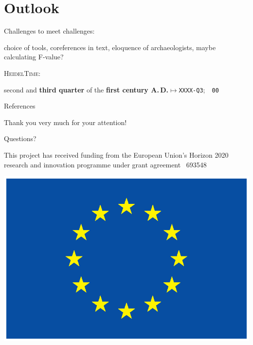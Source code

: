\documentclass[xcolor=x11names, aspectratio=169,usenames,dvipsnames]{beamer}
\begin{document}
\section{Outlook}

\begin{frame}{Challenges to meet}
challenges:

choice of tools, coreferences in text, eloquence of archaeologists, maybe calculating F-value?

\textsc{HeidelTime}:\vspace{-1em}
\begin{center}
second and \textbf{third quarter} of the \textbf{first century A.\,D.}\quad$\longmapsto$\quad\texttt{XXXX-Q3};~~\texttt{00}
\end{center}
\end{frame}

\begin{frame}{References}

\printbibliography[heading=none]
\end{frame}


\begin{frame}[plain]
\vfill\vfill\vfill
\begin{center}\Large
Thank you very much for your attention!\\\bigskip

Questions?
\end{center}\vfill\vfill

\hfill
\begin{minipage}{0.7\textwidth}\scriptsize
\begin{flushright}
This project has received funding from the European Union's Horizon 2020 research and innovation programme under grant agreement \textnumero\ 693548
\end{flushright}
\end{minipage}\hspace*{1em}
\begin{minipage}{0.1\textwidth}
\includegraphics[width=\textwidth]{img/eu_flag.ps}
\end{minipage}
\end{frame}

\maketitle
\end{document}
